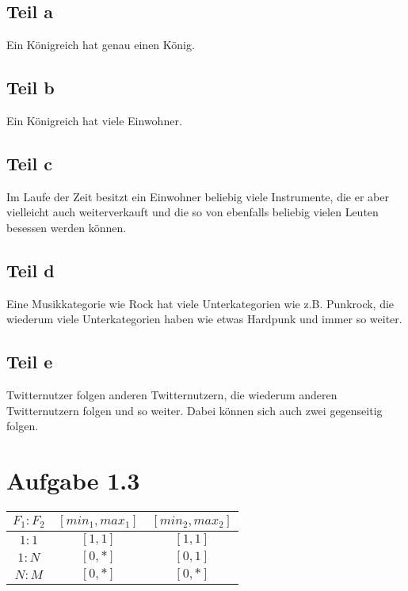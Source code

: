 \documentclass[10pt,a4paper]{article}
\begin{document}
\subsection{Teil a}

Ein Königreich hat genau einen König.

\subsection{Teil b}

Ein Königreich hat viele Einwohner.

\subsection{Teil c}

Im Laufe der Zeit besitzt ein Einwohner beliebig viele Instrumente, die er aber
vielleicht auch weiterverkauft und die so von ebenfalls beliebig vielen Leuten
besessen werden können.

\subsection{Teil d}

Eine Musikkategorie wie Rock hat viele Unterkategorien wie z.B. Punkrock, die
wiederum viele Unterkategorien haben wie etwas Hardpunk und immer so weiter.

\subsection{Teil e}

Twitternutzer folgen anderen Twitternutzern, die wiederum anderen Twitternutzern
folgen und so weiter. Dabei können sich auch zwei gegenseitig folgen.

\section{Aufgabe 1.3}

\begin{tabular}{c|c|c}
  $F_{1} : F_{2}$ & $[min_{1}, max_{1}]$ & $[min_{2}, max_{2}]$\\\hline
  $1 : 1$ & $[1, 1]$ & $[1, 1]$\\\hline
  $1 : N$ & $[0, *]$ & $[0, 1]$\\\hline
  $N : M$ & $[0, *]$ & $[0, *]$
\end{tabular}
\end{document}
